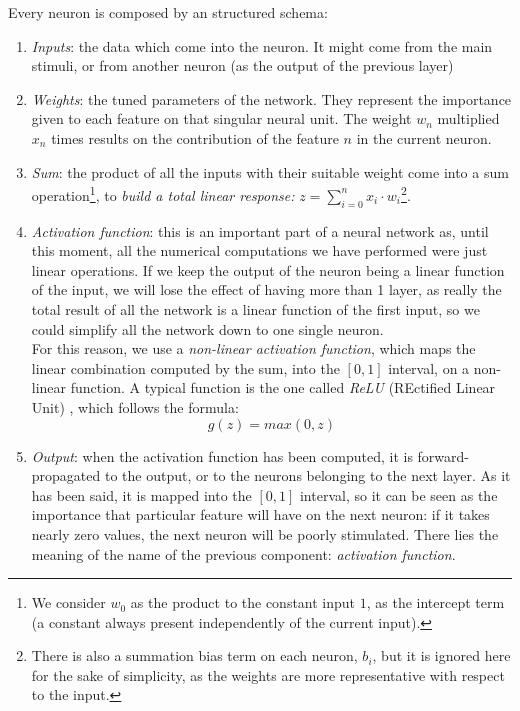 Every neuron is composed by an structured schema:
\begin{enumerate}
	\item \emph{Inputs}: the data which come into the neuron. It might come from the main stimuli, or from another neuron (as the output of the previous layer)
	\item \emph{Weights}: the tuned parameters of the network. They represent the importance given to each feature on that singular neural unit. The weight $w_n$ multiplied $x_n$ times results on the contribution of the feature $n$ in the current neuron. 
	\item \emph{Sum}: the product of all the inputs with their suitable weight come into a sum operation\footnote{We consider $w_0$ as the product to the constant input $1$, as the intercept term (a constant always present independently of the current input).}, to \textit{build a total linear response:} $ z = \sum_{i=0}^{n}x_i \cdot w_i$\footnote{There is also a summation bias term on each neuron, $b_i$, but it is ignored here for the sake of simplicity, as the weights are more representative with respect to the input.}.
	\item \emph{Activation function}: this is an important part of a neural network as, until this moment, all the numerical computations we have performed were just linear operations. If we keep the output of the neuron being a linear function of the input, we will lose the effect of having more than 1 layer, as really the total result of all the network is a linear function of the first input, so we could simplify all the network down to one single neuron. \\
	
	For this reason, we use a \textit{non-linear activation function}, which maps the linear combination computed by the sum, into the $[0,1]$ interval, on a non-linear function. A typical function is the one called \emph{ReLU} (REctified Linear Unit) \cite{relu}, which follows the formula:
	\begin{equation}
		g(z) = max(0, z)
		\label{eqn:1_relu}
	\end{equation}
	
	\item \emph{Output}: when the activation function has been computed, it is forward-propagated to the output, or to the neurons belonging to the next layer. As it has been said, it is mapped into the $[0, 1]$ interval, so it can be seen as the importance that particular feature will have on the next neuron: if it takes nearly zero values, the next neuron will be poorly stimulated. There lies the meaning of the name of the previous component: \emph{activation function}.
\end{enumerate}

